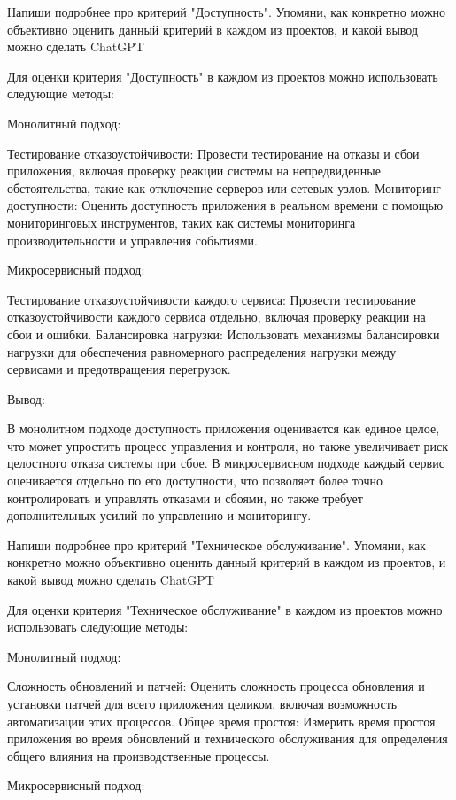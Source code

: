 Напиши подробнее про критерий "Доступность". Упомяни, как конкретно можно объективно оценить данный критерий в каждом из проектов, и какой вывод можно сделать
ChatGPT

Для оценки критерия "Доступность" в каждом из проектов можно использовать следующие методы:

Монолитный подход:

    Тестирование отказоустойчивости: Провести тестирование на отказы и сбои приложения, включая проверку реакции системы на непредвиденные обстоятельства, такие как отключение серверов или сетевых узлов.
    Мониторинг доступности: Оценить доступность приложения в реальном времени с помощью мониторинговых инструментов, таких как системы мониторинга производительности и управления событиями.

Микросервисный подход:

    Тестирование отказоустойчивости каждого сервиса: Провести тестирование отказоустойчивости каждого сервиса отдельно, включая проверку реакции на сбои и ошибки.
    Балансировка нагрузки: Использовать механизмы балансировки нагрузки для обеспечения равномерного распределения нагрузки между сервисами и предотвращения перегрузок.

Вывод:

    В монолитном подходе доступность приложения оценивается как единое целое, что может упростить процесс управления и контроля, но также увеличивает риск целостного отказа системы при сбое.
    В микросервисном подходе каждый сервис оценивается отдельно по его доступности, что позволяет более точно контролировать и управлять отказами и сбоями, но также требует дополнительных усилий по управлению и мониторингу.

Напиши подробнее про критерий "Техническое обслуживание". Упомяни, как конкретно можно объективно оценить данный критерий в каждом из проектов, и какой вывод можно сделать
ChatGPT

Для оценки критерия "Техническое обслуживание" в каждом из проектов можно использовать следующие методы:

Монолитный подход:

    Сложность обновлений и патчей: Оценить сложность процесса обновления и установки патчей для всего приложения целиком, включая возможность автоматизации этих процессов.
    Общее время простоя: Измерить время простоя приложения во время обновлений и технического обслуживания для определения общего влияния на производственные процессы.

Микросервисный подход:

